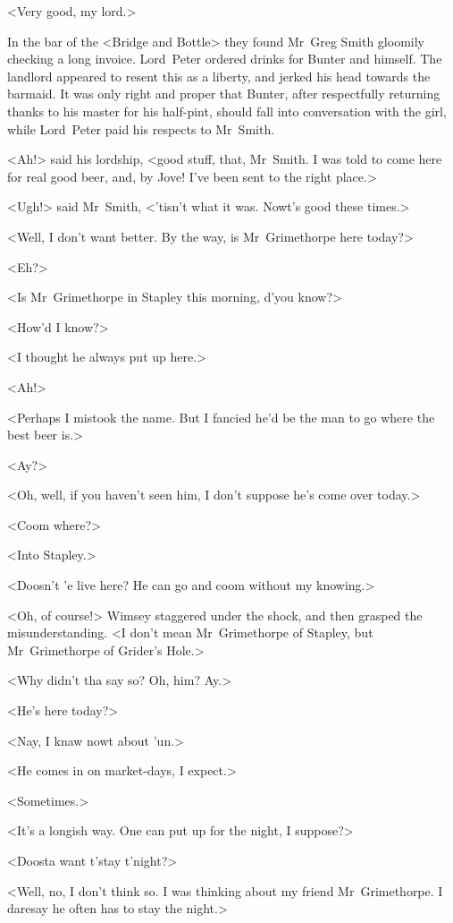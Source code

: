 <Very good, my lord.>

In the bar of the <Bridge and Bottle> they found Mr~Greg Smith gloomily checking a long invoice. Lord~Peter ordered drinks for Bunter and himself. The landlord appeared to resent this as a liberty, and jerked his head towards the barmaid. It was only right and proper that Bunter, after respectfully returning thanks to his master for his half-pint, should fall into conversation with the girl, while Lord~Peter paid his respects to Mr~Smith.

<Ah!> said his lordship, <good stuff, that, Mr~Smith. I was told to come here for real good beer, and, by Jove! I've been sent to the right place.>

<Ugh!> said Mr~Smith, <'tisn't what it was. Nowt's good these times.>

<Well, I don't want better. By the way, is Mr~Grimethorpe here today?>

<Eh?>

<Is Mr~Grimethorpe in Stapley this morning, d'you know?>

<How'd I know?>

<I thought he always put up here.>

<Ah!>

<Perhaps I mistook the name. But I fancied he'd be the man to go where the best beer is.>

<Ay?>

<Oh, well, if you haven't seen him, I don't suppose he's come over today.>

<Coom where?>

<Into Stapley.>

<Doosn't 'e live here? He can go and coom without my knowing.>

<Oh, of course!> Wimsey staggered under the shock, and then grasped the misunderstanding. <I don't mean Mr~Grimethorpe of Stapley, but Mr~Grimethorpe of Grider's Hole.>

<Why didn't tha say so? Oh, him? Ay.>

<He's here today?>

<Nay, I knaw nowt about 'un.>

<He comes in on market-days, I expect.>

<Sometimes.>

<It's a longish way. One can put up for the night, I suppose?>

<Doosta want t'stay t'night?>

<Well, no, I don't think so. I was thinking about my friend Mr~Grimethorpe. I daresay he often has to stay the night.>

